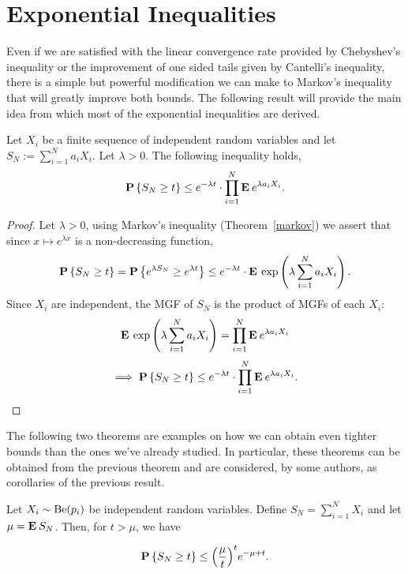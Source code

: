 \chapter{Exponential Inequalities}

Even if we are satisfied with the linear convergence rate provided by Chebyshev's inequality or the improvement of one sided tails given by Cantelli's inequality, there is a simple but powerful modification we can make to Markov's inequality that will greatly improve both bounds. The following result will provide the main idea from which most of the exponential inequalities are derived.

\begin{theorem}\label{mgf}
  Let $X_i$ be a finite sequence of independent random variables and let $S_N := \sum_{i = 1}^N a_i X_i$. Let $\lambda > 0$. The following inequality holds,
  \[ \P\left\{  S_N \geq t\right\} \leq e^{-\lambda t}\cdot \prod_{i = 1}^N \E e^{\lambda a_i X_i}. \] 

\end{theorem}

\begin{proof}
  Let $\lambda > 0$, using Markov's inequality (Theorem~\ref{markov}) we assert that since $x\mapsto e^{\lambda x}$ is a non-decreasing function,
  \[ \P\left\{  S_N \geq t\right\} = \P\left\{  e^{\lambda S_N} \geq e^{\lambda t}\right\} \leq e^{-\lambda t} \cdot \E \exp\left( \lambda \sum_{i = 1}^N a_i X_i \right). \]
  Since $X_i$ are independent, the MGF of $S_N$ is the product of MGFs of each $X_i$:
  \[\E \exp\left( \lambda \sum_{i = 1}^N a_i X_i \right) = \prod_{i = 1}^N \E e^{\lambda a_i X_i} \] 
  \[ \implies \P\left\{  S_N \geq t\right\} \leq e^{-\lambda t}\cdot \prod_{i = 1}^N \E e^{\lambda a_i X_i}. \]
\end{proof}

The following two theorems are examples on how we can obtain even tighter bounds than the ones we've already studied. In particular, these theorems can be obtained from the previous theorem and are considered, by some authors, as corollaries of the previous result.

\begin{theorem}\label{chernoff:bernoulli}
  Let $X_i \sim \Be(p_i)$ be independent random variables. Define $S_N = \sum_{i = 1}^{N} X_i$ and let $\mu = \E S_N$. Then, for $t > \mu$, we have
  
  \[ \P\left\{  S_N \geq t\right\} \leq  {\left(\frac{\mu}{t}\right)}^t e^{-\mu+t} .\] 
\end{theorem}

